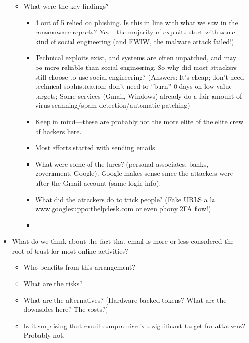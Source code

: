 \documentclass[11pt]{article}
\begin{document}
\begin{itemize}
\begin{itemize}
\begin{itemize}
        \end{itemize}
        \item What were the key findings?
        \begin{itemize}
            \item 4 out of 5 relied on phishing. Is this in line with what we saw in the ransomware reports? Yes---the majority of exploits start with some kind of social engineering (and FWIW, the malware attack failed!)
            \item Technical exploits exist, and systems are often unpatched, and may be more reliable than social engineering. So why did most attackers still choose to use social engineering? (Answers: It's cheap; don't need technical sophistication; don't need to ``burn'' 0-days on low-value targets; Some services (Gmail, Windows) already do a fair amount of virus scanning/spam detection/automatic patching)
            \item Keep in mind---these are probably not the more elite of the elite crew of hackers here. 
            \item Most efforts started with sending emails.
            \item What were some of the lures? (personal associates, banks, government, Google). Google makes sense since the attackers were after the Gmail account (same login info). 
            \item What did the attackers do to trick people? (Fake URLS a la www.googlesupporthelpdesk.com or even phony 2FA flow!)
        \end{itemize}
        \begin{itemize}
            \item 
        \end{itemize}
    \end{itemize}
    \item What do we think about the fact that email is more or less considered the root of trust for most online activities?
    \begin{itemize}
        \item Who benefits from this arrangement?
        \item What are the risks?
        \item What are the alternatives? (Hardware-backed tokens? What are the downsides here? The costs?)
        \item Is it surprising that email compromise is a significant target for attackers? Probably not. 
    \end{itemize}

\end{itemize}
\end{document}
